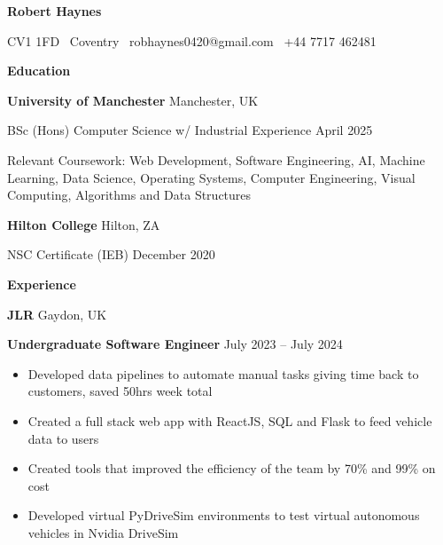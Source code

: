 \documentclass[11pt]{article}
\begin{document}
\begin{center}
    \textbf{Robert Haynes}\\ 
    \hrulefill
\end{center}

\begin{center}
    CV1 1FD \textbullet \ Coventry \textbullet \ robhaynes0420@gmail.com \textbullet \ +44 7717 462481
\end{center}

\vspace{0.5pt}

\begin{center}
    \textbf{Education}
\end{center}
\textbf{University of Manchester} \hfill Manchester, UK

BSc (Hons) Computer Science w/ Industrial Experience \hfill April 2025

Relevant Coursework: Web Development, Software Engineering, AI, Machine Learning, Data Science, Operating Systems, Computer Engineering, Visual Computing, Algorithms and Data Structures

\vspace{12pt}

\textbf{Hilton College} \hfill	Hilton, ZA

NSC Certificate (IEB) \hfill December 2020

\vspace{12pt}

\begin{center}
    \textbf{Experience}
\end{center}
\textbf{JLR} \hfill Gaydon, UK

\textbf{Undergraduate Software Engineer} \hfill July 2023 – July 2024
\begin{itemize}[noitemsep, topsep=0pt, partopsep=0pt, parsep=0pt]
    \item Developed data pipelines to automate manual tasks giving time back to customers, saved 50hrs week total
    \item Created a full stack web app with ReactJS, SQL and Flask to feed vehicle data to users
    \item Created tools that improved the efficiency of the team by 70\% and 99\% on cost 
    \item Developed virtual PyDriveSim environments to test virtual autonomous vehicles in Nvidia DriveSim
\end{itemize}

\vspace{12pt}
\end{document}
